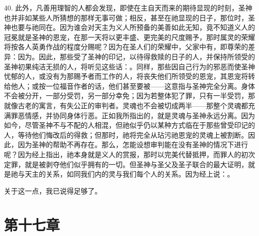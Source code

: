 40. 此外，凡善用理智的人都会发现，即使在主自天而来的期待显现的时刻，圣神也并非如某些人所猜想的那样无事可做；相反，甚至在祂显现的日子，那位时，圣神也要与祂同在。因为谁会对天主为义人所预备的美善如此无知，竟不知道义人的冠冕就是圣神的恩宠，在那一天将以更丰盛、更完美的尺度赐予，那时属灵的荣耀将按各人英勇作战的程度分赐呢？因为在圣人们的荣耀中，父家中有，即尊荣的差异：因为。因此，那些受了圣神的印记，以待得救赎的日子的人，并保持所领受的圣神初果纯洁无损的人，将听见这些话：。同样，那些因自己行为的邪恶而使圣神忧郁的人，或没有为那赐予者而工作的人，将丧失他们所领受的恩宠，其恩宠将转给他人；或按一位福音作者的话，他们甚至要被——这意指与圣神完全分离。身体不会被分开，一部分受罚，另一部分幸免；因为若整体犯了罪，只有一半受罚，那就像古老的寓言，有失公正的审判者。灵魂也不会被切成两半——那整个灵魂都充满罪恶情感，并协同身体行恶。正如我所指出的，就是灵魂与圣神永远分离。因为如今，尽管圣神不与不配的人相混，但祂似乎仍以某种方式临在于那些曾受印记的人，等待他们悔改后的得救；但那时，祂将完全从玷污祂恩宠的灵魂上被割断。因此，因为圣神的帮助不再存在。那么，怎能设想审判能在没有圣神的情况下进行呢？因为经上指出，祂本身就是义人的赏报，那时以完美代替抵押，而罪人的初次定罪，就是被剥夺他们似乎拥有的一切。但圣神与圣父及圣子联合的最大证明，就是祂与天主的关系，如同我们内的灵与我们每个人的关系。因为经上说：。\par

关于这一点，我已说得足够了。\par


\section{第十七章}

\par

